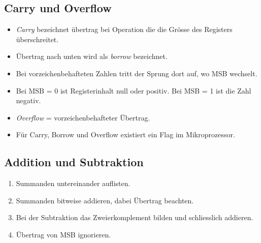 \subsection{Carry und Overflow}
\begin{itemize}
	\item \textit{Carry} bezeichnet übertrag bei Operation die die Grösse des Registers überschreitet.
	\item Übertrag nach unten wird als \textit{borrow} bezeichnet.
	\item Bei vorzeichenbehafteten Zahlen tritt der Sprung dort auf, wo MSB wechselt.
	\item Bei MSB = 0 ist Registerinhalt null oder positiv. Bei MSB = 1 ist die Zahl negativ.
	\item \textit{Overflow} = vorzeichenbehafteter Übertrag.
	\item Für Carry, Borrow und Overflow existiert ein Flag im Mikroprozessor.
\end{itemize}

\subsection{Addition und Subtraktion}
\begin{enumerate}
	\item Summanden untereinander auflisten.
	\item Summanden bitweise addieren, dabei Übertrag beachten.
	\item Bei der Subtraktion das Zweierkomplement bilden und schliesslich addieren.
	\item Übertrag von MSB ignorieren.
\end{enumerate}

